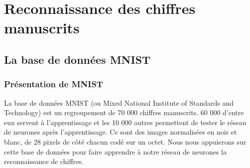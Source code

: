 \chapter{Reconnaissance des chiffres manuscrits}

\section{La base de données MNIST}

\subsection{Présentation de MNIST}
La base de données MNIST (ou Mixed National Institute of Standards and Technology) est un regroupement de 70 000 chiffres manuscrits. 60 000 d'entre eux servent à l'apprentissage et les 10 000 autres permettent de tester le réseau de neurones après l'apprentissage. Ce sont des images normalisées en noir et blanc, de 28 pixels de côté chacun codé sur un octet. Nous nous appuierons sur cette base de données pour faire apprendre à notre réseau de neurones la reconnaissance de chiffres.


